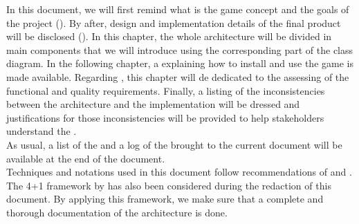 In this document, we will first remind what is the game concept and the goals of the project (). By after,
design and implementation details of the final product will be disclosed (). In this chapter, the whole architecture will be divided in main components that we will introduce using the corresponding part of the class diagram. In the following chapter, a  explaining how to install and use the game is made available. Regarding , this chapter will de dedicated to the assessing of the functional and quality requirements. Finally, a listing of the inconsistencies between the architecture and the implementation will be dressed and justifications for those inconsistencies will be provided to help stakeholders understand the . \\

As usual, a list of the  and a log of the  brought to the current document will be available at the end of the document.  \\

Techniques and notations used in this document follow recommendations of \cite{bass2013} and \cite{larman2005}. The 4+1 framework by \cite{4plus1} has also been considered during the redaction of this document. By applying this framework, we make sure that a complete and thorough documentation of the architecture is done.
